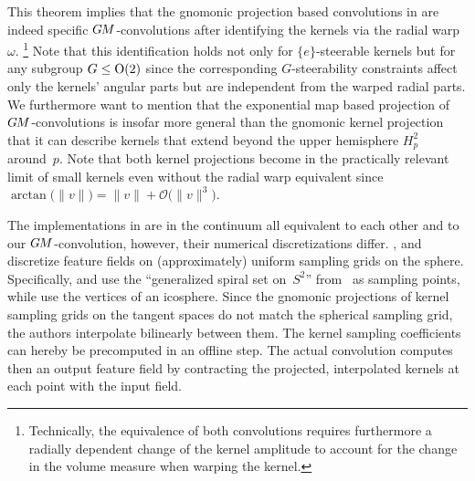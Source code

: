 This theorem implies that the gnomonic projection based convolutions in
\cite{coors2018spherenet,zhao2018distortion,tateno2018distortion,eder2019convolutions,martin2020panoramic}
are indeed specific $G\mkern-1.4muM$-convolutions after identifying the kernels via the radial warp $\omega$.%
\footnote{
    Technically, the equivalence of both convolutions requires furthermore a radially dependent change of the kernel amplitude to account for the change in the volume measure when warping the kernel.
}
Note that this identification holds not only for $\{e\}$-steerable kernels but for any subgroup $G\leq\operatorname{O}(2)$ since the corresponding $G$-steerability constraints affect only the kernels' angular parts but are independent from the warped radial parts.
We furthermore want to mention that the exponential map based projection of $G\mkern-1.4muM$-convolutions is insofar more general than the gnomonic kernel projection that it can describe kernels that extend beyond the upper hemisphere $H_p^2$ around~$p$.
Note that both kernel projections become in the practically relevant limit of small kernels even without the radial warp equivalent since $\arctan\big(\lVert v\rVert\big) = \lVert v\rVert + \mathcal{O}\big(\lVert v\rVert^3\big)$.

The implementations in \cite{coors2018spherenet,zhao2018distortion,tateno2018distortion,eder2019convolutions,martin2020panoramic}
are in the continuum all equivalent to each other and to our $G\mkern-1.4muM$-convolution, however, their numerical discretizations differ.
\citet{coors2018spherenet}, \citet{eder2019convolutions} and \citet{martin2020panoramic} discretize feature fields on (approximately) uniform sampling grids on the sphere.
Specifically, \citet{coors2018spherenet} and \citet{martin2020panoramic} use the ``generalized spiral set on~$S^2$'' from~\cite{saff1997distributing} as sampling points, while \citet{eder2019convolutions} use the vertices of an icosphere.
Since the gnomonic projections of kernel sampling grids on the tangent spaces do not match the spherical sampling grid, the authors interpolate bilinearly between them.
The kernel sampling coefficients can hereby be precomputed in an offline step.
The actual convolution computes then an output feature field by contracting the projected, interpolated kernels at each point with the input field.


